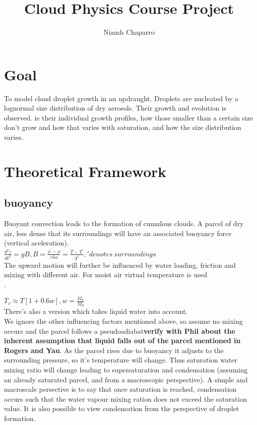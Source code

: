 \documentclass[11pt]{article} %
\title{Cloud Physics Course Project}
\author{Niamh Chaparro}
\begin{document}
\maketitle

\section{Goal}

To model cloud droplet growth in an updraught.  Droplets are nucleated by a lognormal size distribution of dry aerosols.  Their growth and evolution is observed. ie their individual growth profiles, how those smaller than a certain size don't grow and how that varies with saturation, and how the size distribution varies.

\section{Theoretical Framework}

\subsection{buoyancy}

Buoyant convection leads to the formation of cumulous clouds.  A parcel of dry air, less dense that its surroundings will have an associated buoyancy force (vertical aceleration).\\

$\frac{d^{2}z}{dt^{2}} = gB, B = \frac{\rho^{'} - \rho}{rho} = \frac{T - T^{'}}{T^{'}}, ' denotes \ surroundings$\\

The upward motion will further be influenced by water loading, friction and mixing with different air.  For moist air virtual temperature is used\\.  

$T_{v} \approx T[1 + 0.6w], w  = \frac{M_{v}}{M_{d}}$\\

There's also a version which takes liquid water into account.\\  

We ignore the other influencing factors mentioned above, so assume no mixing occurs and the parcel follows a pseudoadiabat{\bf verify with Phil about the inherent assumption that liquid falls out of the parcel mentioned in Rogers and Yau}.  As the parcel rises due to buoyancy it adjusts to the surrounding pressure, so it's temperature will change.  Thus saturation water mixing ratio will change leading to supersaturation and condensation (assuming an already saturated parcel, and from a macroscopic perspective).  A simple and macroscale persective is to say that once saturation is reached, condensation occurs such that the water vapour mixing ration does not exceed the saturation value.  It is also possible to view condensation from the perspective of droplet formation.
\end{document}
